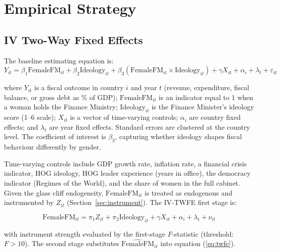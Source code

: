 \documentclass[12pt]{article}
\begin{document}
\section{Empirical Strategy}
\label{sec:empirics}

\subsection{IV Two-Way Fixed Effects}
\label{sec:ivtwfe}

The baseline estimating equation is:
\vspace{-0.4cm}
\begin{equation}
\label{eq:twfe}
Y_{it} = \beta_1 \text{FemaleFM}_{it} + \beta_2 \text{Ideology}_{it}
       + \beta_3 (\text{FemaleFM}_{it} \times \text{Ideology}_{it})
       + \gamma X_{it} + \alpha_i + \lambda_t + \varepsilon_{it}
\end{equation}

where $Y_{it}$ is a fiscal outcome in country $i$ and year $t$ (revenue,
expenditure, fiscal balance, or gross debt as \% of GDP); $\text{FemaleFM}_{it}$
is an indicator equal to 1 when a woman holds the Finance Ministry;
$\text{Ideology}_{it}$ is the Finance Minister's ideology score (1--6 scale);
$X_{it}$ is a vector of time-varying controls; $\alpha_i$ are country fixed
effects; and $\lambda_t$ are year fixed effects. Standard errors are clustered
at the country level. The coefficient of interest is $\beta_3$, capturing
whether ideology shapes fiscal behaviour differently by gender.

Time-varying controls include GDP growth rate, inflation rate, a financial
crisis indicator, HOG ideology, HOG leader experience (years in office), the
democracy indicator (Regimes of the World), and the share of women in the full
cabinet. Given the glass cliff endogeneity, $\text{FemaleFM}_{it}$ is treated
as endogenous and instrumented by $Z_{it}$ (Section~\ref{sec:instrument}).
The IV-TWFE first stage is:

\begin{equation}
\label{eq:firststage}
\text{FemaleFM}_{it} = \pi_1 Z_{it} + \pi_2 \text{Ideology}_{it}
                      + \gamma X_{it} + \alpha_i + \lambda_t + \nu_{it}
\end{equation}

with instrument strength evaluated by the first-stage $F$-statistic
(threshold: $F > 10$). The second stage substitutes
$\widehat{\text{FemaleFM}}_{it}$ into equation (\ref{eq:twfe}).
\end{document}
